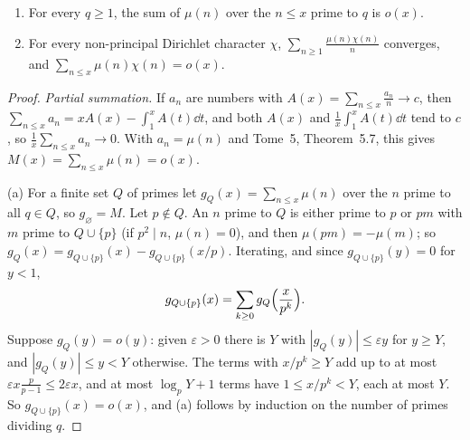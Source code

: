 \begin{lemma}\label{lem:mobchi}
\begin{enumerate}[label=(\alph*)]
\item For every $q\ge1$, the sum of $\mu(n)$ over the $n\le x$ prime to $q$ is $o(x)$.
\item For every non-principal Dirichlet character $\chi$, $\sum_{n\ge1}\frac{\mu(n)\chi(n)}n$ converges, and $\sum_{n\le x}\mu(n)\chi(n)=o(x)$.
\end{enumerate}
\end{lemma}
\begin{proof}
\emph{Partial summation.} If $a_n$ are numbers with $A(x)=\sum_{n\le x}\frac{a_n}n\to c$, then $\sum_{n\le x}a_n=xA(x)-\int_1^xA(t)\dd t$, and both $A(x)$ and
$\frac1x\int_1^xA(t)\dd t$ tend to $c$, so $\frac1x\sum_{n\le x}a_n\to0$. With $a_n=\mu(n)$ and Tome~5, Theorem~5.7, this gives $M(x)=\sum_{n\le x}\mu(n)=o(x)$.

(a) For a finite set $Q$ of primes let $g_Q(x)=\sum_{n\le x}\mu(n)$ over the $n$ prime to all $q\in Q$, so $g_\varnothing=M$. Let $p\notin Q$. An $n$ prime to $Q$ is
either prime to $p$ or $pm$ with $m$ prime to $Q\cup\{p\}$ (if $p^2\mid n$, $\mu(n)=0$), and then $\mu(pm)=-\mu(m)$; so $g_Q(x)=g_{Q\cup\{p\}}(x)-g_{Q\cup\{p\}}(x/p)$.
Iterating, and since $g_{Q\cup\{p\}}(y)=0$ for $y<1$,
\[
g_{Q\cup\{p\}}(x)=\sum_{k\ge0}g_Q\Bigl(\frac x{p^k}\Bigr).
\]
Suppose $g_Q(y)=o(y)$: given $\varepsilon>0$ there is $Y$ with $|g_Q(y)|\le\varepsilon y$ for $y\ge Y$, and $|g_Q(y)|\le y<Y$ otherwise. The terms with
$x/p^k\ge Y$ add up to at most $\varepsilon x\frac p{p-1}\le2\varepsilon x$, and at most $\log_pY+1$ terms have $1\le x/p^k<Y$, each at most $Y$. So
$g_{Q\cup\{p\}}(x)=o(x)$, and (a) follows by induction on the number of primes dividing $q$.


\end{proof}
